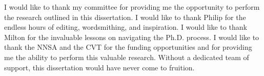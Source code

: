 \begin{acknowledgments}
    I would like to thank my committee for providing me the opportunity to perform the research outlined in this dissertation. I would like to thank Philip for the endless hours of editing, wordsmithing, and inspiration. I would like to thank Milton for the invaluable lessons on navigating the Ph.D. process. I would like to thank the NNSA and the CVT for the funding opportunities and for providing me the ability to perform this valuable research. Without a dedicated team of support, this dissertation would have never come to fruition.
\end{acknowledgments}
